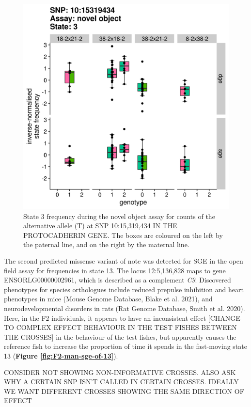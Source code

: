 \documentclass[
]{book}
\begin{document}
\begin{figure}
\includegraphics[width=1\linewidth]{figs/mikk_behaviour/sig_snps_boxplots/3-10:15319434} \caption{State 3 frequency during the novel object assay for counts of the alternative allele (T) at SNP 10:15,319,434 IN THE PROTOCADHERIN GENE. The boxes are coloured on the left by the paternal line, and on the right by the maternal line.}\label{fig:sig-snp-10-15mb}
\end{figure}

The second predicted missense variant of note was detected for SGE in the open field assay for frequencies in state 13. The locus 12:5,136,828 maps to gene ENSORLG00000002961, which is described as a complement \emph{C9}. Discovered phenotypes for species orthologues include reduced prepulse inhibition and heart phenotypes in mice (Mouse Genome Database, Blake et al. 2021), and neurodevelopmental disorders in rats (Rat Genome Database, Smith et al. 2020). Here, in the F2 individuals, it appears to have an inconsistent effect {[}CHANGE TO COMPLEX EFFECT BEHAVIOUR IN THE TEST FISHES BETWEEN THE CROSSES{]} in the behaviour of the test fishes, but apparently causes the reference fish to increase the proportion of time it spends in the fast-moving state 13 (\textbf{Figure \ref{fig:F2-man-sge-of-13}}).

CONSIDER NOT SHOWING NON-INFORMATIVE CROSSES. ALSO ASK WHY A CERTAIN SNP ISN'T CALLED IN CERTAIN CROSSES.
IDEALLY WE WANT DIFFERENT CROSSES SHOWING THE SAME DIRECTION OF EFFECT
\end{document}
